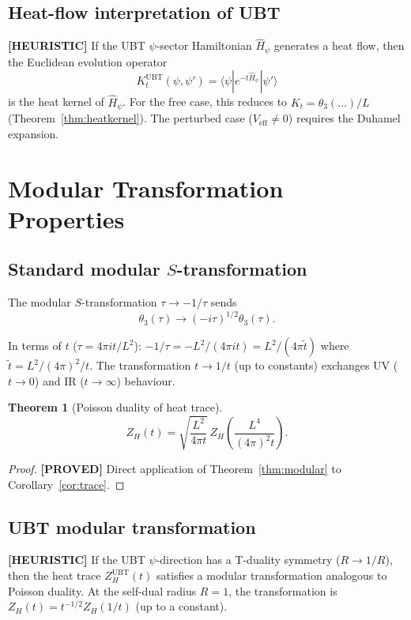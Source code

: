 \documentclass[11pt,a4paper]{article}
\newtheorem{theorem}{Theorem}
\newcommand{\proved}[1]{\textbf{[PROVED]} #1}
\newcommand{\heuristic}[1]{\textbf{[HEURISTIC]} #1}
\begin{document}
\subsection{Heat-flow interpretation of UBT}

\heuristic{If the UBT $\psi$-sector Hamiltonian $\hat{H}_\psi$ generates
a heat flow, then the Euclidean evolution operator
\[
  K_t^\mathrm{UBT}(\psi, \psi') = \langle\psi|e^{-t\hat{H}_\psi}|\psi'\rangle
\]
is the heat kernel of $\hat{H}_\psi$.  For the free case, this reduces to
$K_t = \theta_3(\ldots)/L$ (Theorem~\ref{thm:heatkernel}).  The perturbed
case ($V_\mathrm{eff} \neq 0$) requires the Duhamel expansion.}

\section{Modular Transformation Properties}

\subsection{Standard modular $S$-transformation}

The modular $S$-transformation $\tau \to -1/\tau$ sends
\[
  \theta_3(\tau) \to (-i\tau)^{1/2}\theta_3(\tau).
\]

In terms of $t$ ($\tau = 4\pi it/L^2$): $-1/\tau = -L^2/(4\pi it) = L^2/(4\pi \tilde{t})$
where $\tilde{t} = L^2/(4\pi)^2/t$.  The transformation $t \to 1/t$ (up to constants)
exchanges UV ($t \to 0$) and IR ($t \to \infty$) behaviour.

\begin{theorem}[Poisson duality of heat trace]
  \[
    Z_H(t) = \sqrt{\frac{L^2}{4\pi t}}\, Z_H\!\left(\frac{L^4}{(4\pi)^2 t}\right).
  \]
\end{theorem}

\begin{proof}
  \proved{} Direct application of Theorem~\ref{thm:modular} to Corollary~\ref{cor:trace}.
\end{proof}

\subsection{UBT modular transformation}

\heuristic{If the UBT $\psi$-direction has a T-duality symmetry ($R \to 1/R$),
then the heat trace $Z_H^\mathrm{UBT}(t)$ satisfies a modular transformation
analogous to Poisson duality.  At the self-dual radius $R = 1$, the
transformation is $Z_H(t) = t^{-1/2} Z_H(1/t)$ (up to a constant).}
\end{document}
